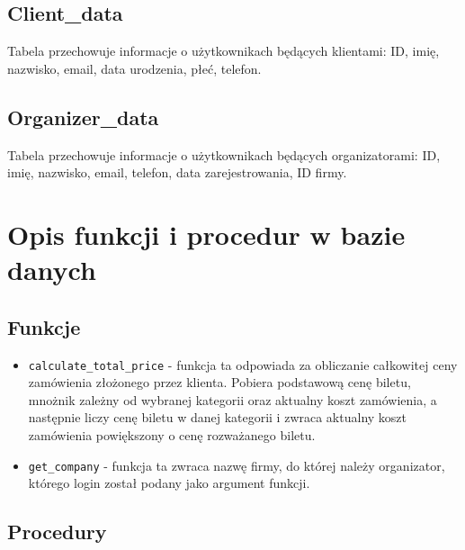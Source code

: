 \documentclass[12pt]{article}
\begin{document}
    \subsection{Client\_data}
    
        Tabela przechowuje informacje o użytkownikach będących klientami: ID, imię, nazwisko, email, data urodzenia, płeć, telefon.
        
    \subsection{Organizer\_data}
    
        Tabela przechowuje informacje o użytkownikach będących organizatorami: ID, imię, nazwisko, email, telefon, data zarejestrowania, ID firmy.
        
\section{Opis funkcji i procedur w bazie danych}         

    \subsection{Funkcje}
    
        \begin{itemize}
            \item {\tt calculate\_total\_price} - funkcja ta odpowiada za obliczanie całkowitej ceny zamówienia złożonego przez klienta. Pobiera podstawową cenę biletu, mnożnik zależny od wybranej kategorii oraz aktualny koszt zamówienia, a następnie liczy cenę biletu w danej kategorii i zwraca aktualny koszt zamówienia powiększony o cenę rozważanego biletu.
            \item {\tt get\_company} - funkcja ta zwraca nazwę firmy, do której należy organizator, którego login został podany jako argument funkcji.
        \end{itemize}
        
    \subsection{Procedury}
    
\end{document}
